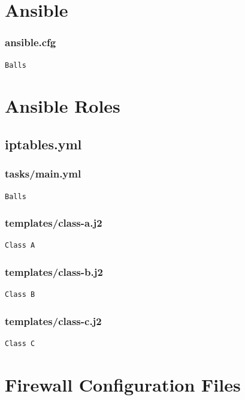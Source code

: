 \appendix
\section{Ansible}
\label{app:Ansible}
\subsubsection{ansible.cfg}
\label{subsec:ansible}
\begin{verbatim}
Balls
\end{verbatim}


\section{Ansible Roles}
\label{app:Ansible-roles}

\subsection{iptables.yml}
\subsubsection{tasks/main.yml}
\begin{verbatim}
Balls
\end{verbatim}

\subsubsection{templates/class-a.j2}
\begin{verbatim}
Class A
\end{verbatim}

\subsubsection{templates/class-b.j2}
\begin{verbatim}
Class B
\end{verbatim}

\subsubsection{templates/class-c.j2}
\begin{verbatim}
Class C
\end{verbatim}


\section{Firewall Configuration Files}
\label{app:config}

